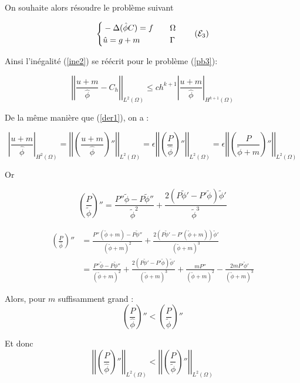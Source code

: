 \documentclass[french]{article}
\begin{document}
	On souhaite alors résoudre le problème suivant
	
	\begin{equation}
		\left\{\begin{aligned}
			&-\Delta (\hat{\phi}C)=f \quad &&\Omega \\
			&\hat{u}=g+m \quad &&\Gamma
		\end{aligned}\right. \label{pb3} \tag{$\mathcal{E}_3$}
	\end{equation}
	
	Ainsi l'inégalité (\ref{ine2}) se réécrit pour le problème (\ref{pb3}):
	
	\begin{equation}
		\left|\left|\frac{u+m}{\hat{\phi}}-C_h\right|\right|_{L^2(\Omega)}\le ch^{k+1}\left|\frac{u+m}{\hat{\phi}}\right|_{H^{k+1}(\Omega)} \label{ine3}
	\end{equation}
	
	De la même manière que (\ref{der1}), on a :
	
	\begin{equation}
		\left|\frac{u+m}{\hat{\phi}}\right|_{H^2(\Omega)}=\left|\left|\left(\frac{u+m}{\hat{\phi}}\right)''\right|\right|_{L^2(\Omega)}=\epsilon\left|\left|\left(\frac{P}{\hat{\phi}}\right)''\right|\right|_{L^2(\Omega)}=\epsilon\left|\left|\left(\frac{P}{\tilde{\phi}+m}\right)''\right|\right|_{L^2(\Omega)} \label{der2}
	\end{equation}
	
	Or
	
	$$\left(\frac{P}{\tilde{\phi}}\right)''=\frac{P''\tilde{\phi}-P\tilde{\phi}''}{\tilde{\phi}^2}+\frac{2(P\tilde{\phi}'-P'\tilde{\phi})\tilde{\phi}'}{\tilde{\phi}^3}$$
	
	\begin{align*}
		\left(\frac{P}{\hat{\phi}}\right)''&=\frac{P''(\tilde{\phi}+m)-P\tilde{\phi}''}{(\tilde{\phi}+m)^2}+\frac{2(P\tilde{\phi}'-P'(\tilde{\phi}+m))\tilde{\phi}'}{(\tilde{\phi}+m)^3} \\
		&=\frac{P''\tilde{\phi}-P\tilde{\phi}''}{(\tilde{\phi}+m)^2}+\frac{2(P\tilde{\phi}'-P'\tilde{\phi})\tilde{\phi}'}{(\tilde{\phi}+m)^3}+    \frac{mP''}{(\tilde{\phi}+m)^2}-\frac{2mP'\tilde{\phi}'}{(\tilde{\phi}+m)^3}
	\end{align*}

	Alors, pour $m$ suffisamment grand :
	$$\left(\frac{P}{\hat{\phi}}\right)''<\left(\frac{P}{\tilde{\phi}}\right)''$$

	Et donc	
	\begin{equation}
		\left|\left|\left(\frac{P}{\hat{\phi}}\right)''\right|\right|_{L^2(\Omega)}<\left|\left|\left(\frac{P}{\tilde{\phi}}\right)''\right|\right|_{L^2(\Omega)} \label{ine_fin}
	\end{equation}
	
\end{document}
